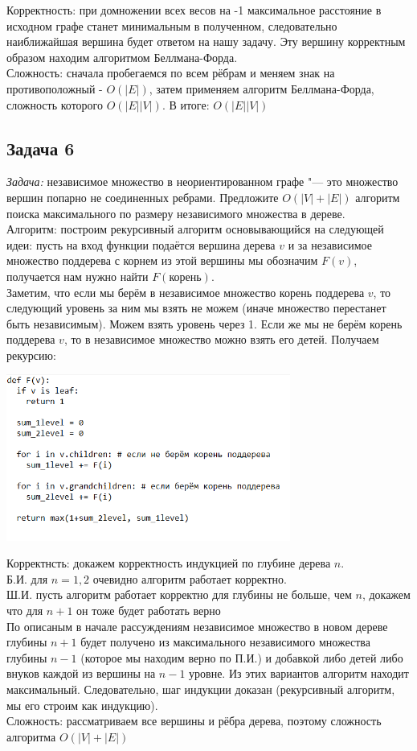 \documentclass[a4paper,12pt]{article} %
\begin{document}
Корректность: при домножении всех весов на -1 максимальное расстояние в исходном графе станет минимальным в полученном, следовательно наиближайшая вершина будет ответом на нашу задачу. Эту вершину корректным образом находим алгоритмом Беллмана-Форда.\\

Сложность: сначала пробегаемся по всем рёбрам и меняем знак на противоположный - $ O(|E|) $, затем применяем алгоритм Беллмана-Форда, сложность которого $ O(|E||V|) $. В итоге: $ O(|E||V|) $


\subsection*{Задача 6}
\textit{Задача:} независимое множество в неориентированном графе "--- это множество вершин попарно не соединенных ребрами. Предложите $O(|V|+|E|)$ алгоритм поиска максимального по размеру независимого множества в дереве.\\

Алгоритм: построим рекурсивный алгоритм основывающийся на следующей идеи: пусть на вход функции подаётся вершина дерева $ v $ и за независимое множество поддерева с корнем из этой вершины мы обозначим $ F(v) $, получается нам нужно найти $ F(\text{корень}) $.\\

Заметим, что если мы берём в независимое множество корень поддерева $ v $, то следующий уровень за ним мы взять не можем (иначе множество перестанет быть независимым). Можем взять уровень через 1. Если же мы не берём корень поддерева $ v $, то в независимое множество можно взять его детей. Получаем рекурсию:

\begin{center}
\includegraphics[width=0.7\textwidth]{code}
\end{center}

Корректнсть: докажем корректность индукцией по глубине дерева $ n $.\\
Б.И. для $ n = 1,2 $ очевидно алгоритм работает корректно.\\
Ш.И. пусть алгоритм работает корректно для глубины не больше, чем $ n $, докажем что для $ n+1 $ он тоже будет работать верно\\
По описаным в начале рассуждениям независимое множество в новом дереве глубины $ n+1 $ будет получено из максимального независимого множества глубины $ n-1 $ (которое мы находим верно по П.И.) и добавкой либо детей либо внуков каждой из вершины на $ n-1 $ уровне. Из этих вариантов алгоритм находит максимальный. Следовательно, шаг индукции доказан (рекурсивный алгоритм, мы его строим как индукцию).\\

Сложность: рассматриваем все вершины и рёбра дерева, поэтому сложность алгоритма $ O(|V|+|E|)$
\end{document}
